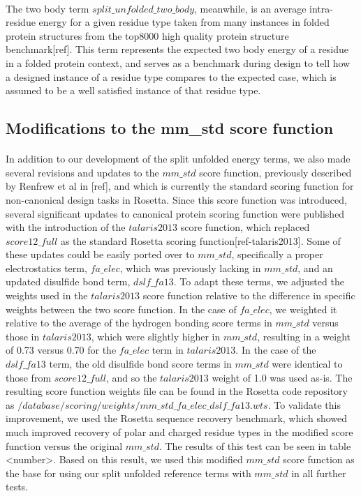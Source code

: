 \paragraph{}
The two body term $split\_unfolded\_two\_body$, meanwhile, is an average intra-residue energy for a given residue type taken from many instances in folded protein structures from the top8000 high quality protein structure benchmark[ref]. This term represents the expected two body energy of a residue in a folded protein context, and serves as a benchmark during design to tell how a designed instance of a residue type compares to the expected case, which is assumed to be a well satisfied instance of that residue type. 

\subsection{Modifications to the mm\_std score function}
\paragraph{}
In addition to our development of the split unfolded energy terms, we also made several revisions and updates to the $mm\_std$ score function, previously described by Renfrew et al in [ref], and which is currently the standard scoring function for non-canonical design tasks in Rosetta. Since this score function was introduced, several significant updates to canonical protein scoring function were published with the introduction of the $talaris2013$ score function, which replaced $score12\_full$ as the standard Rosetta scoring function[ref-talaris2013]. Some of these updates could be easily ported over to $mm\_std$, specifically a proper electrostatics term, $fa\_elec$, which was previously lacking in $mm\_std$, and an updated disulfide bond term, $dslf\_fa13$. To adapt these terms, we adjusted the weights used in the $talaris2013$ score function relative to the difference in specific weights between the two score function. In the case of $fa\_elec$, we weighted it relative to the average of the hydrogen bonding score terms in $mm\_std$ versus those in $talaris2013$, which were slightly higher in $mm\_std$, resulting in a weight of 0.73 versus 0.70 for the $fa\_elec$ term in $talaris2013$. In the case of the $dslf\_fa13$ term, the old disulfide bond score terms in $mm\_std$ were identical to those from $score12\_full$, and so the $talaris2013$ weight of 1.0 was used as-is. The resulting score function weights file can be found in the Rosetta code repository as $/database/scoring/weights/mm\_std\_fa\_elec\_dslf\_fa13.wts$. To validate this improvement, we used the Rosetta sequence recovery benchmark, which showed much improved recovery of polar and charged residue types in the modified score function versus the original $mm\_std$. The results of this test can be seen in table <number>. Based on this result, we used this modified $mm\_std$ score function as the base for using our split unfolded reference terms with $mm\_std$ in all further tests.


